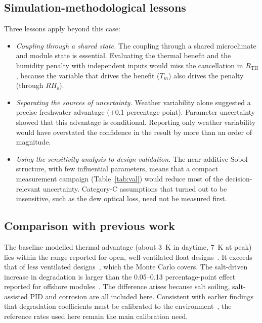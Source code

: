 \documentclass[preprint,11pt]{elsarticle}
\newcommand{\RHs}{\mathit{RH}_{\mathrm{s}}}
\begin{document}
\subsection{Simulation-methodological lessons}
Three lessons apply beyond this case:
\begin{itemize}
\item \emph{Coupling through a shared state.} The coupling through a shared microclimate and module state is
essential. Evaluating the thermal benefit and the humidity penalty with independent inputs would miss the cancellation
in $R_{\mathrm{TH}}$, because the variable that drives the benefit ($T_m$) also drives the penalty (through $\RHs$).
\item \emph{Separating the sources of uncertainty.} Weather variability alone suggested a precise freshwater advantage
($\pm0.1$ percentage point). Parameter uncertainty showed that this advantage is conditional. Reporting only weather
variability would have overstated the confidence in the result by more than an order of magnitude.
\item \emph{Using the sensitivity analysis to design validation.} The near-additive Sobol structure, with few
influential parameters, means that a compact measurement campaign (Table~\ref{tab:val}) would reduce most of the
decision-relevant uncertainty. Category-C assumptions that turned out to be insensitive, such as the dew optical loss,
need not be measured first.
\end{itemize}

\subsection{Comparison with previous work}
The baseline modelled thermal advantage (about 3~K in daytime, 7~K at peak) lies within the range reported for open,
well-ventilated float designs~\cite{liu2018,dorenkamper2021}. It exceeds that of less ventilated
designs~\cite{nysted2024,firat2026}, which the Monte Carlo covers. The salt-driven increase in degradation is larger than
the 0.05--0.13 percentage-point effect reported for offshore modules~\cite{ajmal2025}. The difference arises because
salt soiling, salt-assisted PID and corrosion are all included here. Consistent with earlier findings that degradation
coefficients must be calibrated to the environment~\cite{mannino2023,hameed2024}, the reference rates used here remain
the main calibration need.
\end{document}
